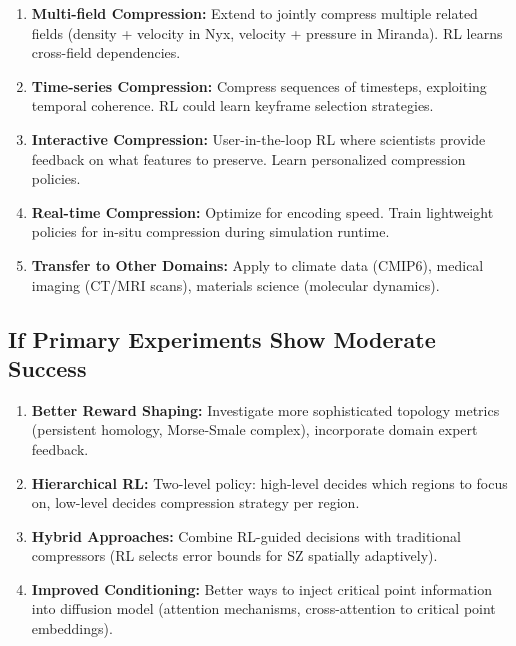 \documentclass[11pt]{article}
\begin{document}
\begin{enumerate}
    \item \textbf{Multi-field Compression:} Extend to jointly compress multiple related fields (density + velocity in Nyx, velocity + pressure in Miranda). RL learns cross-field dependencies.

    \item \textbf{Time-series Compression:} Compress sequences of timesteps, exploiting temporal coherence. RL could learn keyframe selection strategies.

    \item \textbf{Interactive Compression:} User-in-the-loop RL where scientists provide feedback on what features to preserve. Learn personalized compression policies.

    \item \textbf{Real-time Compression:} Optimize for encoding speed. Train lightweight policies for in-situ compression during simulation runtime.

    \item \textbf{Transfer to Other Domains:} Apply to climate data (CMIP6), medical imaging (CT/MRI scans), materials science (molecular dynamics).
\end{enumerate}

\subsection{If Primary Experiments Show Moderate Success}

\begin{enumerate}
    \item \textbf{Better Reward Shaping:} Investigate more sophisticated topology metrics (persistent homology, Morse-Smale complex), incorporate domain expert feedback.

    \item \textbf{Hierarchical RL:} Two-level policy: high-level decides which regions to focus on, low-level decides compression strategy per region.

    \item \textbf{Hybrid Approaches:} Combine RL-guided decisions with traditional compressors (RL selects error bounds for SZ spatially adaptively).

    \item \textbf{Improved Conditioning:} Better ways to inject critical point information into diffusion model (attention mechanisms, cross-attention to critical point embeddings).
\end{enumerate}
\end{document}
